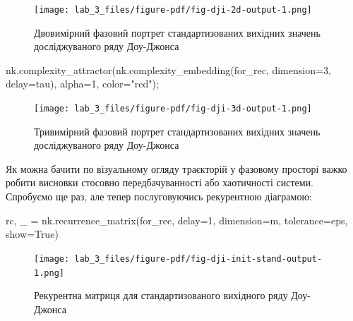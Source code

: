 \documentclass[
  letterpaper,
]{report}
\newenvironment{Shaded}{\begin{snugshade}}{\end{snugshade}}
\newcommand{\DecValTok}[1]{\textcolor[rgb]{0.68,0.00,0.00}{#1}}
\newcommand{\NormalTok}[1]{\textcolor[rgb]{0.00,0.23,0.31}{#1}}
\newcommand{\OperatorTok}[1]{\textcolor[rgb]{0.37,0.37,0.37}{#1}}
\newcommand{\StringTok}[1]{\textcolor[rgb]{0.13,0.47,0.30}{#1}}
\newcommand{\VariableTok}[1]{\textcolor[rgb]{0.07,0.07,0.07}{#1}}
\begin{document}
\begin{figure}[H]

{\centering \texttt{[image: lab\_3\_files/figure-pdf/fig-dji-2d-output-1.png]}

}

\caption{\label{fig-dji-2d}Двовимірний фазовий портрет стандартизованих
вихідних значень досліджуваного ряду Доу-Джонса}

\end{figure}

\begin{Shaded}
\begin{Highlighting}[]
\NormalTok{nk.complexity\_attractor(nk.complexity\_embedding(for\_rec, dimension}\OperatorTok{=}\DecValTok{3}\NormalTok{, delay}\OperatorTok{=}\NormalTok{tau), }
\NormalTok{                        alpha}\OperatorTok{=}\DecValTok{1}\NormalTok{, }
\NormalTok{                        color}\OperatorTok{=}\StringTok{"red"}\NormalTok{)}\OperatorTok{;} 
\end{Highlighting}
\end{Shaded}

\begin{figure}[H]

{\centering \texttt{[image: lab\_3\_files/figure-pdf/fig-dji-3d-output-1.png]}

}

\caption{\label{fig-dji-3d}Тривимірний фазовий портрет стандартизованих
вихідних значень досліджуваного ряду Доу-Джонса}

\end{figure}

Як можна бачити по візуальному огляду траєкторій у фазовому просторі
важко робити висновки стосовно передбачуванності або хаотичності
системи. Спробуємо ще раз, але тепер послуговуючись рекурентною
діаграмою:

\begin{Shaded}
\begin{Highlighting}[]
\NormalTok{rc, \_ }\OperatorTok{=}\NormalTok{ nk.recurrence\_matrix(for\_rec, }
\NormalTok{                            delay}\OperatorTok{=}\DecValTok{1}\NormalTok{, }
\NormalTok{                            dimension}\OperatorTok{=}\NormalTok{m,}
\NormalTok{                            tolerance}\OperatorTok{=}\NormalTok{eps,}
\NormalTok{                            show}\OperatorTok{=}\VariableTok{True}\NormalTok{)}
\end{Highlighting}
\end{Shaded}

\begin{figure}[H]

{\centering \texttt{[image: lab\_3\_files/figure-pdf/fig-dji-init-stand-output-1.png]}

}

\caption{\label{fig-dji-init-stand}Рекурентна матриця для
стандартизованого вихідного ряду Доу-Джонса}

\end{figure}
\end{document}
